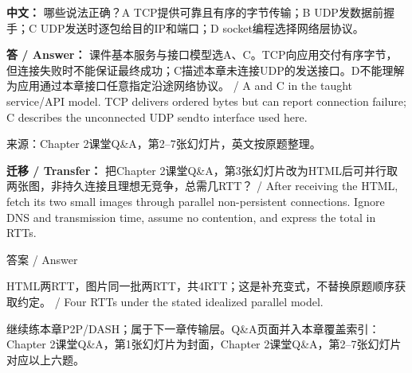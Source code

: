 \textbf{中文：} 哪些说法正确？A TCP提供可靠且有序的字节传输；B UDP发数据前握手；C UDP发送时逐包给目的IP和端口；D socket编程选择网络层协议。


\textbf{答 / Answer：} 课件基本服务与接口模型选A、C。TCP向应用交付有序字节，但连接失败时不能保证最终成功；C描述本章未连接UDP的发送接口。D不能理解为应用通过本章接口任意指定沿途网络协议。 / A and C in the taught service/API model. TCP delivers ordered bytes but can report connection failure; C describes the unconnected UDP sendto interface used here.


来源：Chapter 2课堂Q\&A，第2–7张幻灯片，英文按原题整理。


\textbf{迁移 / Transfer：} 把Chapter 2课堂Q\&A，第3张幻灯片改为HTML后可并行取两张图，非持久连接且理想无竞争，总需几RTT？ / After receiving the HTML, fetch its two small images through parallel non-persistent connections. Ignore DNS and transmission time, assume no contention, and express the total in RTTs.



\begin{StudySolution}{答案 / Answer}


HTML两RTT，图片同一批两RTT，共4RTT；这是补充变式，不替换原题顺序获取约定。 / Four RTTs under the stated idealized parallel model.


\end{StudySolution}


继续练本章P2P/DASH；属于下一章传输层。Q\&A页面并入本章覆盖索引：Chapter 2课堂Q\&A，第1张幻灯片为封面，Chapter 2课堂Q\&A，第2–7张幻灯片对应以上六题。




